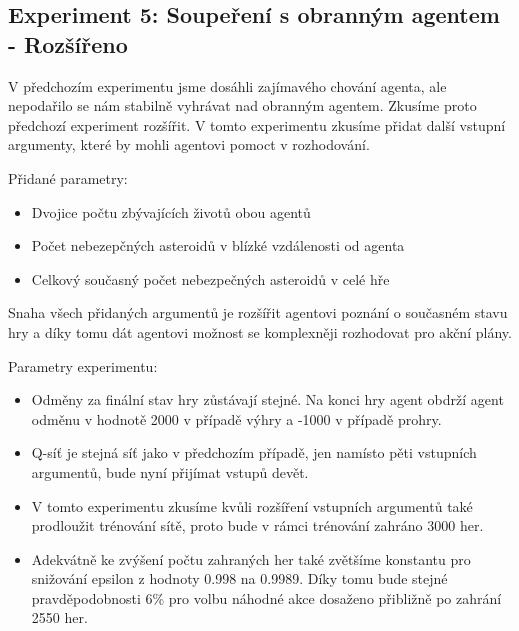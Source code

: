 \subsection{Experiment 5: Soupeření s obranným agentem - Rozšířeno}
V předchozím experimentu jsme dosáhli zajímavého chování agenta, ale nepodařilo se nám stabilně vyhrávat nad obranným agentem.
Zkusíme proto předchozí experiment rozšířit. 
V tomto experimentu zkusíme přidat další vstupní argumenty, které by mohli agentovi pomoct v rozhodování.

Přidané parametry:
\begin{itemize}
    \item Dvojice počtu zbývajících životů obou agentů            
    \item Počet nebezepčných asteroidů v blízké vzdálenosti od agenta
    \item Celkový současný počet nebezpečných asteroidů v celé hře
\end{itemize}
Snaha všech přidaných argumentů je rozšířit agentovi poznání o současném stavu hry a díky tomu dát agentovi možnost se komplexněji rozhodovat pro akční plány.

Parametry experimentu:
\begin{itemize}
    \item Odměny za finální stav hry zůstávají stejné. Na konci hry agent obdrží agent odměnu v hodnotě 2000 v případě výhry a -1000 v případě prohry.
    \item Q-síť je stejná síť jako v předchozím případě, jen namísto pěti vstupních argumentů, bude nyní přijímat vstupů devět.
    \item V tomto experimentu zkusíme kvůli rozšíření vstupních argumentů také prodloužit trénování sítě, proto bude v rámci trénování zahráno 3000 her.
    \item Adekvátně ke zvýšení počtu zahraných her také zvětšíme konstantu pro snižování epsilon z hodnoty 0.998 na 0.9989. Díky tomu bude stejné pravděpodobnosti 6\% pro volbu náhodné akce dosaženo přibližně po zahrání 2550 her.
\end{itemize}

